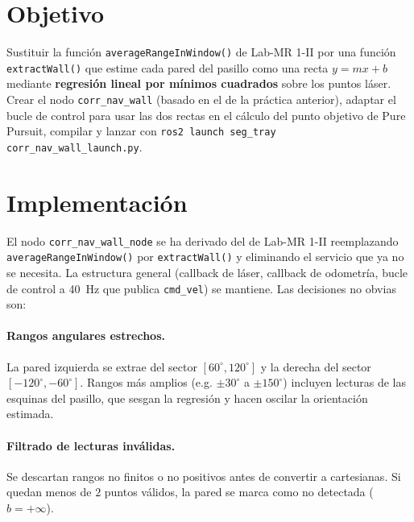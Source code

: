 \section{Objetivo}
Sustituir la funci\'{o}n \texttt{averageRangeInWindow()} de Lab-MR 1-II por una funci\'{o}n \texttt{extractWall()} que estime cada pared del pasillo como una recta $y = mx + b$ mediante \textbf{regresi\'{o}n lineal por m\'{i}nimos cuadrados} sobre los puntos l\'{a}ser. Crear el nodo \texttt{corr\_nav\_wall} (basado en el de la pr\'{a}ctica anterior), adaptar el bucle de control para usar las dos rectas en el c\'{a}lculo del punto objetivo de Pure Pursuit, compilar y lanzar con \texttt{ros2 launch seg\_tray corr\_nav\_wall\_launch.py}.


\section{Implementaci\'{o}n}

El nodo \texttt{corr\_nav\_wall\_node} se ha derivado del de Lab-MR 1-II reemplazando \texttt{averageRangeInWindow()} por \texttt{extractWall()} y eliminando el servicio que ya no se necesita. La estructura general (callback de l\'{a}ser, callback de odometr\'{i}a, bucle de control a 40~Hz que publica \texttt{cmd\_vel}) se mantiene. Las decisiones no obvias son:

\paragraph{Rangos angulares estrechos.} La pared izquierda se extrae del sector $[60^\circ, 120^\circ]$ y la derecha del sector $[-120^\circ, -60^\circ]$. Rangos m\'{a}s amplios (e.g. $\pm 30^\circ$ a $\pm 150^\circ$) incluyen lecturas de las esquinas del pasillo, que sesgan la regresi\'{o}n y hacen oscilar la orientaci\'{o}n estimada.

\paragraph{Filtrado de lecturas inv\'{a}lidas.} Se descartan rangos no finitos o no positivos antes de convertir a cartesianas. Si quedan menos de $2$ puntos v\'{a}lidos, la pared se marca como no detectada ($b = +\infty$).

